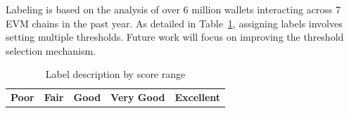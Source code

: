 \documentclass[runningheads]{llncs}
\begin{document}
{%


Labeling is based on the analysis of over 6 million wallets interacting across 7 EVM chains in the past year. As detailed in Table~\ref{tab4}, assigning labels involves setting multiple thresholds. Future work will focus on improving the threshold selection mechanism.

\begin{table}[h!]
\fontsize{6pt}{9pt}\selectfont
\caption{Label description by score range}\label{tab4}
\centering
\begin{tabular}{|p{2.4cm}|p{2.4cm}|p{2.4cm}|p{2.4cm}|p{2.4cm}|}
\hline
\textbf{Poor} & \textbf{Fair} & \textbf{Good}& \textbf{Very Good}& \textbf{Excellent} \\


\end{tabular}
\end{table}}
\end{document}
